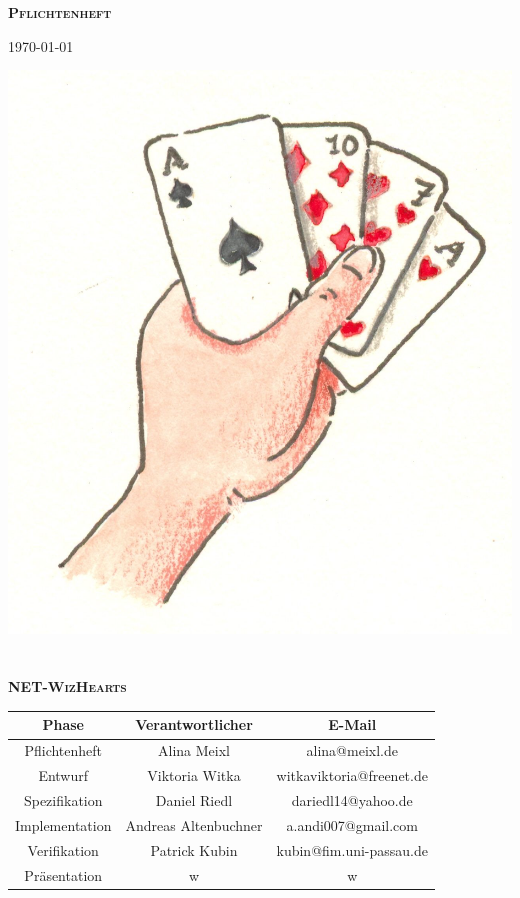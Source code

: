 \documentclass{article}
\begin{document}
\begin{titlepage}

\begin{center}
\textbf{\textsc{\LARGE Pflichtenheft}}

{\large \today}

\vspace{2cm}
\includegraphics{kartenspiel} 
\ \\
\ \\

\textbf{\textsc{\LARGE NET-WizHearts}}

\vspace{2cm}

\begin{tabular}{|c|c|c|}\hline
   Phase & Verantwortlicher & E-Mail \\ \hline\hline
   Pflichtenheft & Alina  Meixl  &  alina@meixl.de \\ \hline
   Entwurf & Viktoria Witka & witkaviktoria@freenet.de \\ \hline
   Spezifikation & Daniel Riedl & dariedl14@yahoo.de \\ \hline
   Implementation & Andreas Altenbuchner& a.andi007@gmail.com\\ \hline
   Verifikation &Patrick Kubin & kubin@fim.uni-passau.de\\ \hline
   Präsentation & w& w\\ \hline
 \end{tabular}

\end{center}

\end{titlepage}
\end{document}
